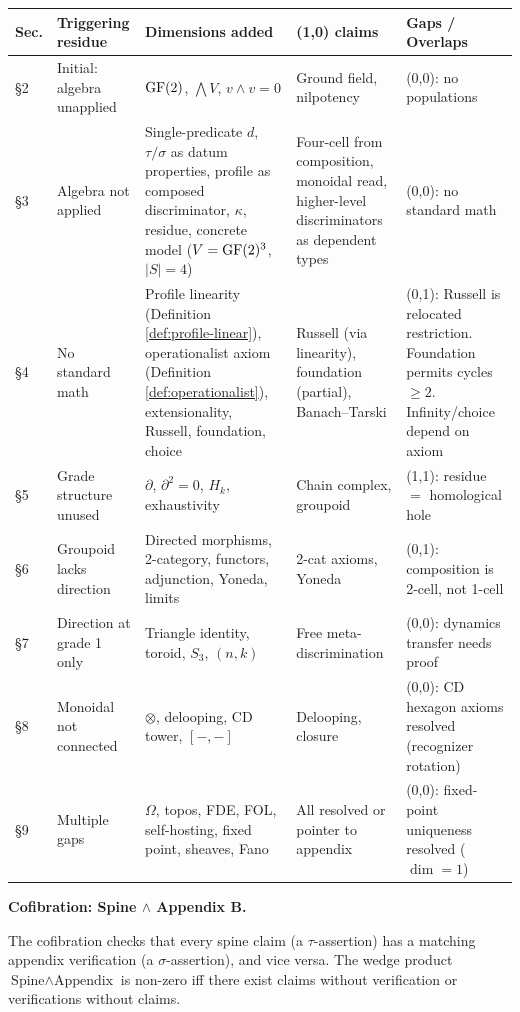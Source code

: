 \begin{center}
\small
\begin{tabular}{p{1.0cm}|p{2.5cm}|p{2.5cm}|p{2.5cm}|p{2.5cm}}
\textbf{Sec.} & \textbf{Triggering residue} &
\textbf{Dimensions added} &
\textbf{(1,0) claims} &
\textbf{Gaps / Overlaps} \\
\hline
\S2 &
Initial: algebra unapplied &
$\operatorname{GF}(2)$, $\bigwedge V$, $v \wedge v = 0$ &
Ground field, nilpotency &
(0,0): no populations \\
\hline
\S3 &
Algebra not applied &
Single-predicate $d$, $\tau/\sigma$ as
datum properties, profile as composed
discriminator, $\kappa$, residue,
concrete model ($V = \operatorname{GF}(2)^3$, $|S| = 4$) &
Four-cell from composition, monoidal read,
higher-level discriminators as dependent types &
(0,0): no standard math \\
\hline
\S4 &
No standard math &
Profile linearity (Definition \ref{def:profile-linear}), operationalist axiom (Definition \ref{def:operationalist}),
extensionality, Russell, foundation, choice &
Russell (via linearity), foundation (partial),
Banach--Tarski &
(0,1): Russell is relocated restriction.
Foundation permits cycles $\geq 2$.
Infinity/choice depend on axiom \\
\hline
\S5 &
Grade structure unused &
$\partial$, $\partial^2 = 0$, $H_k$, exhaustivity &
Chain complex, groupoid &
(1,1): residue $=$ homological hole \\
\hline
\S6 &
Groupoid lacks direction &
Directed morphisms, 2-category, functors,
adjunction, Yoneda, limits &
2-cat axioms, Yoneda &
(0,1): composition is 2-cell, not 1-cell \\
\hline
\S7 &
Direction at grade 1 only &
Triangle identity, toroid, $S_3$, $(n,k)$ &
Free meta-discrimination &
(0,0): dynamics transfer needs proof \\
\hline
\S8 &
Monoidal not connected &
$\otimes$, delooping, CD tower, $[{-},{-}]$ &
Delooping, closure &
(0,0): CD hexagon axioms resolved (recognizer rotation) \\
\hline
\S9 &
Multiple gaps &
$\Omega$, topos, FDE, FOL, self-hosting,
fixed point, sheaves, Fano &
All resolved or pointer to appendix &
(0,0): fixed-point uniqueness resolved ($\dim = 1$) \\
\end{tabular}
\end{center}

\medskip
\noindent\textbf{Cofibration: Spine $\wedge$ Appendix B.}

The cofibration checks that every spine claim (a
$\tau$-assertion) has a matching appendix verification
(a $\sigma$-assertion), and vice versa. The wedge product
$\text{Spine} \wedge \text{Appendix}$ is non-zero iff
there exist claims without verification or verifications
without claims.

